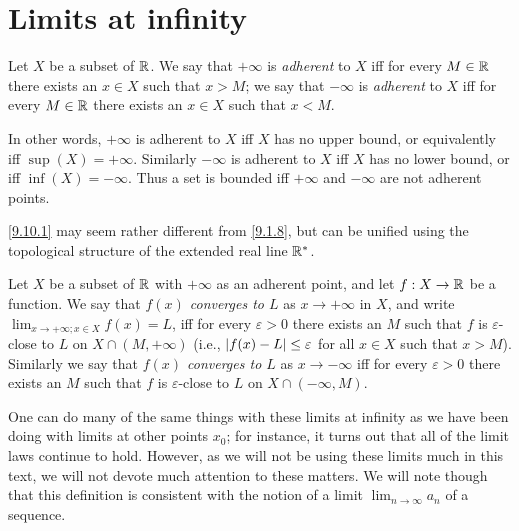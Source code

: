\section{Limits at infinity}\label{sec:9.10}

\begin{defn}\label{9.10.1}
  Let \(X\) be a subset of \(\mathbb{R}\).
  We say that \(+\infty\) is \emph{adherent} to \(X\) iff for every \(M \in \mathbb{R}\) there exists an \(x \in X\) such that \(x > M\);
  we say that \(-\infty\) is \emph{adherent} to \(X\) iff for every \(M \in \mathbb{R}\) there exists an \(x \in X\) such that \(x < M\).
\end{defn}

\begin{note}
  In other words, \(+\infty\) is adherent to \(X\) iff \(X\) has no upper bound, or equivalently iff \(\sup(X) = +\infty\).
  Similarly \(-\infty\) is adherent to \(X\) iff \(X\) has no lower bound, or iff \(\inf(X) = -\infty\).
  Thus a set is bounded iff \(+\infty\) and \(-\infty\) are not adherent points.
\end{note}

\begin{rmk}\label{9.10.2}
  \cref{9.10.1} may seem rather different from \cref{9.1.8}, but can be unified using the topological structure of the extended real line \(\mathbb{R}^*\).
\end{rmk}

\begin{defn}\label{9.10.3}
  Let \(X\) be a subset of \(\mathbb{R}\) with \(+\infty\) as an adherent point, and let \(f : X \to \mathbb{R}\) be a function.
  We say that \emph{\(f(x)\) converges to \(L\)} as \(x \to +\infty\) in \(X\), and write \(\lim_{x \to +\infty ; x \in X} f(x) = L\), iff for every \(\varepsilon > 0\) there exists an \(M\) such that \(f\) is \(\varepsilon\)-close to \(L\) on \(X \cap (M, +\infty)\)
  (i.e., \(\left\lvert f(x) - L\right\rvert \leq \varepsilon\) for all \(x \in X\) such that \(x > M\)).
  Similarly we say that \emph{\(f(x)\) converges to \(L\)} as \(x \to -\infty\) iff for every \(\varepsilon > 0\) there exists an \(M\) such that \(f\) is \(\varepsilon\)-close to \(L\) on \(X \cap (-\infty, M)\).
\end{defn}

\begin{note}
  One can do many of the same things with these limits at infinity as we have been doing with limits at other points \(x_0\);
  for instance, it turns out that all of the limit laws continue to hold.
  However, as we will not be using these limits much in this text, we will not devote much attention to these matters.
  We will note though that this definition is consistent with the notion of a limit \(\lim_{n \to \infty} a_n\) of a sequence.
\end{note}

